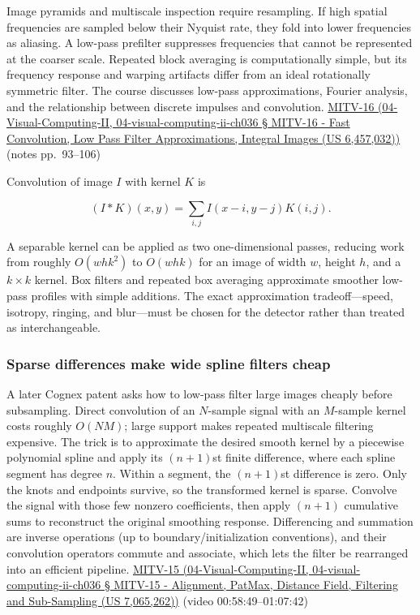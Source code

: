 Image pyramids and multiscale inspection require resampling. If high spatial frequencies are sampled below their Nyquist rate, they fold into lower frequencies as aliasing. A low-pass prefilter suppresses frequencies that cannot be represented at the coarser scale. Repeated block averaging is computationally simple, but its frequency response and warping artifacts differ from an ideal rotationally symmetric filter. The course discusses low-pass approximations, Fourier analysis, and the relationship between discrete impulses and convolution. \href{}{MITV-16 (04-Visual-Computing-II, 04-visual-computing-ii-ch036 § MITV-16 - Fast Convolution, Low Pass Filter Approximations, Integral Images (US 6,457,032))} (notes pp.~93--106)

Convolution of image \(I\) with kernel \(K\) is

\[
(I*K)(x,y)=\sum_{i,j}I(x-i,y-j)K(i,j).
\]

A separable kernel can be applied as two one-dimensional passes, reducing work from roughly \(O(whk^2)\) to \(O(whk)\) for an image of width \(w\), height \(h\), and a \(k\times k\) kernel. Box filters and repeated box averaging approximate smoother low-pass profiles with simple additions. The exact approximation tradeoff---speed, isotropy, ringing, and blur---must be chosen for the detector rather than treated as interchangeable.

\subsubsection{Sparse differences make wide spline filters cheap}\label{sparse-differences-make-wide-spline-filters-cheap}

A later Cognex patent asks how to low-pass filter large images cheaply before subsampling. Direct convolution of an \(N\)-sample signal with an \(M\)-sample kernel costs roughly \(O(NM)\); large support makes repeated multiscale filtering expensive. The trick is to approximate the desired smooth kernel by a piecewise polynomial spline and apply its \((n+1)\)st finite difference, where each spline segment has degree \(n\). Within a segment, the \((n+1)\)st difference is zero. Only the knots and endpoints survive, so the transformed kernel is sparse. Convolve the signal with those few nonzero coefficients, then apply \((n+1)\) cumulative sums to reconstruct the original smoothing response. Differencing and summation are inverse operations (up to boundary/initialization conventions), and their convolution operators commute and associate, which lets the filter be rearranged into an efficient pipeline. \href{}{MITV-15 (04-Visual-Computing-II, 04-visual-computing-ii-ch036 § MITV-15 - Alignment, PatMax, Distance Field, Filtering and Sub-Sampling (US 7,065,262))} (video 00:58:49--01:07:42)

